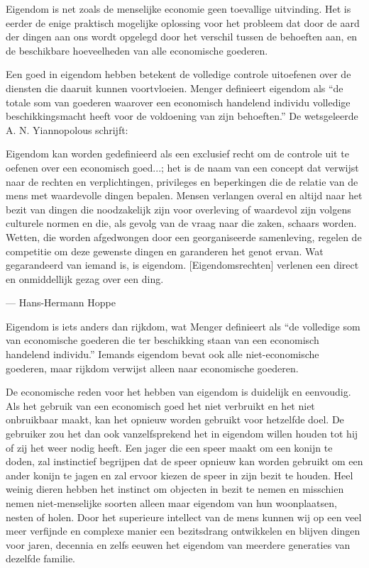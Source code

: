 \begin{blockquotebox}
    Eigendom is net zoals de menselijke economie geen toevallige uitvinding. Het is eerder de enige praktisch mogelijke oplossing voor het probleem dat door de aard der dingen aan ons wordt opgelegd door het verschil tussen de behoeften aan, en de beschikbare hoeveelheden van alle economische goederen.\footnotemark
\end{blockquotebox}


Een goed in eigendom hebben betekent de volledige controle uitoefenen over de diensten die daaruit kunnen voortvloeien. Menger definieert eigendom als \enquote{de totale som van goederen waarover een economisch handelend individu volledige beschikkingsmacht heeft voor de voldoening van zijn behoeften.}\autocite{49} De wetsgeleerde A. N. Yiannopolous schrijft:

\begin{blockquotebox}
    Eigendom kan worden gedefinieerd als een exclusief recht om de controle uit te oefenen over een economisch goed...; het is de naam van een concept dat verwijst naar de rechten en verplichtingen, privileges en beperkingen die de relatie van de mens met waardevolle dingen bepalen. Mensen verlangen overal en altijd naar het bezit van dingen die noodzakelijk zijn voor overleving of waardevol zijn volgens culturele normen en die, als gevolg van de vraag naar die zaken, schaars worden. Wetten, die worden afgedwongen door een georganiseerde samenleving, regelen de competitie om deze gewenste dingen en garanderen het genot ervan. Wat gegarandeerd van iemand is, is eigendom. [Eigendomsrechten] verlenen een direct en onmiddellijk gezag over een ding.\footnotemark
    \par\raggedleft--- Hans-Hermann Hoppe
\end{blockquotebox}

Eigendom is iets anders dan rijkdom, wat Menger definieert als \enquote{de volledige som van economische goederen die ter beschikking staan van een economisch handelend individu.} \autocite{51} Iemands eigendom bevat ook alle niet-economische goederen, maar rijkdom verwijst alleen naar economische goederen.

De economische reden voor het hebben van eigendom is duidelijk en eenvoudig. Als het gebruik van een economisch goed het niet verbruikt en het niet onbruikbaar maakt, kan het opnieuw worden gebruikt voor hetzelfde doel. De gebruiker zou het dan ook vanzelfsprekend het in eigendom willen houden tot hij of zij het weer nodig heeft. Een jager die een speer maakt om een konijn te doden, zal instinctief begrijpen dat de speer opnieuw kan worden gebruikt om een ander konijn te jagen en zal ervoor kiezen de speer in zijn bezit te houden. Heel weinig dieren hebben het instinct om objecten in bezit te nemen en misschien nemen niet-menselijke soorten alleen maar eigendom van hun woonplaatsen, nesten of holen. Door het superieure intellect van de mens kunnen wij op een veel meer verfijnde en complexe manier een bezitsdrang ontwikkelen en blijven dingen voor jaren, decennia en zelfs eeuwen het eigendom van meerdere generaties van dezelfde familie.


